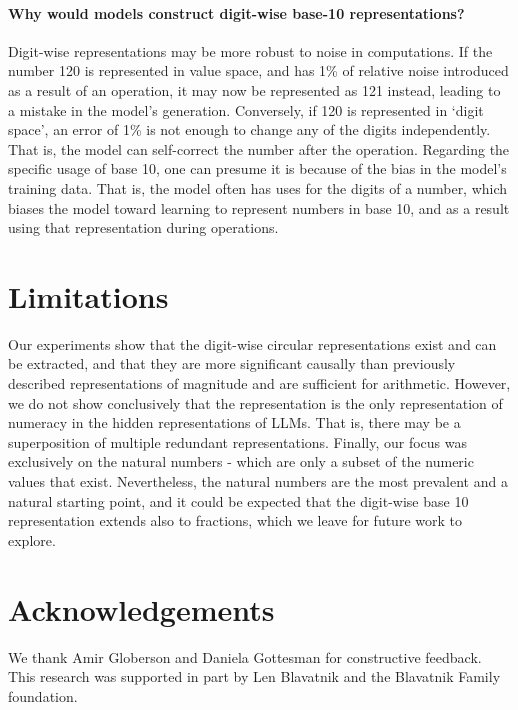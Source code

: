 \documentclass[11pt]{article}
\begin{document}
\paragraph{Why would models construct digit-wise base-10 representations?} 
Digit-wise representations may be more robust to noise in computations. 
If the number 120 is represented in value space, and has 1\% of relative noise introduced as a result of an operation, it may now be represented as 121 instead, leading to a mistake in the model's generation. Conversely, if 120 is represented in `digit space', an error of 1\% is not enough to change any of the digits independently. That is, the model can self-correct the number after the operation. 
Regarding the specific usage of base 10, 
one can presume it is because of the bias in the model's training data. That is, the model often has uses for the digits of a number, which biases the model toward learning to represent numbers in base 10, and as a result using that representation during operations.


\section*{Limitations}
Our experiments show that the digit-wise circular representations exist and can be extracted, and that they are more significant causally than previously described representations of magnitude and are sufficient for arithmetic. However, we do not show conclusively that the representation is the only representation of numeracy in the hidden representations of LLMs. That is, there may be a superposition of multiple redundant representations. Finally, our focus was exclusively on the natural numbers - which are only a subset of the numeric values that exist. Nevertheless, the natural numbers are the most prevalent and a natural starting point, and it could be expected that the digit-wise base 10 representation extends also to fractions, which we leave for future work to explore.

\section*{Acknowledgements}
We thank Amir Globerson and Daniela Gottesman for constructive feedback. This research was supported in part by Len Blavatnik and the Blavatnik Family foundation.


%

\end{document}
